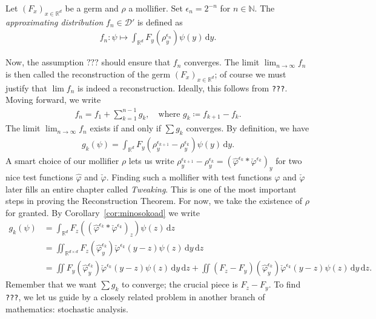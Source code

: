 \begin{definition}\label{def:approximating-distributions}
        Let \({(F_x)}_{x \in \mathbb{R}^d}\) be a germ and \( \rho \) a mollifier. Set \(\epsilon_n = 2^{-n}\) for \(n \in \mathbb{N}\). The \emph{approximating distribution} \(f_n \in \mathcal{D}'\) is defined as 
        \begin{align*}
                f_n: \psi \mapsto \int_{\mathbb{R}^d} F_y(\rho_y^{\epsilon_n}) \psi(y)\, \mathrm{d}y.
        \end{align*}
\end{definition}
Now, the assumption \(\texttt{???}\) should ensure that \(f_n\) converges. The limit \( \lim_{n \to \infty} f_n \) is then called the reconstruction of the germ \( (F_x)_{x \in \mathbb{R}^d} \); of course we must justify that \( \lim f_n \) is indeed a reconstruction. Ideally, this follows from \texttt{???}. Moving forward, we write 
\begin{align*}
    f_n = f_1 + \sum^{n-1}_{k=1}g_k, \quad \text{where } g_k \coloneqq f_{k+1} - f_k.
\end{align*}
The limit \(\lim_{n \to \infty} f_n\) exists if and only if \(\sum g_k\) converges. By definition, we have
\begin{align*}
        g_k(\psi) = \int_{\mathbb{R}^d} F_y(\rho_y^{\epsilon_{k+1}} - \rho_y^{\epsilon_k}) \psi(y)\, \mathrm{d}y.
\end{align*}
A smart choice of our mollifier \( \rho \) lets us write \( \rho^{\epsilon_{k+1}}_y - \rho^{\epsilon_k}_y = {(\hat \varphi^{\epsilon_k} * \check \varphi^{\epsilon_k})}_y\) for two nice test functions \( \hat \varphi \) and \( \check \varphi \). Finding such a mollifier with test functions \( \hat \varphi \) and \( \check \varphi \) later fills an entire chapter called \emph{Tweaking}. This is one of the most important steps in proving the Reconstruction Theorem. For now, we take the existence of \( \rho \) for granted.
By Corollary~\ref{cor:minosokoad} we write
\begin{align*}
    g_k(\psi) &= \int_{\mathbb{R}^d} F_z({(\hat \varphi^{\epsilon_k} * \check \varphi^{\epsilon_k})}_z) \psi(z)\, \mathrm{d}z \\
    &= \iint_{\mathbb{R}^{d \times d}} F_z(\hat \varphi^{\epsilon_k}_y) \check \varphi^{\epsilon_k}(y-z) \psi(z) \, \mathrm{d}y\, \mathrm{d}z \\
    &= \iint F_y(\hat \varphi^{\epsilon_k}_y) \check \varphi^{\epsilon_k}(y-z) \psi(z) \, \mathrm{d}y\, \mathrm{d}z 
    + \iint (F_z - F_y)(\hat \varphi^{\epsilon_k}_y) \check \varphi^{\epsilon_k}(y-z) \psi(z) \, \mathrm{d}y\, \mathrm{d}z.
\end{align*}
Remember that we want \(\sum g_k\) to converge; the crucial piece is \( F_z - F_y \). To find \texttt{???}, we let us guide by a closely related problem in another branch of mathematics: stochastic analysis. 


